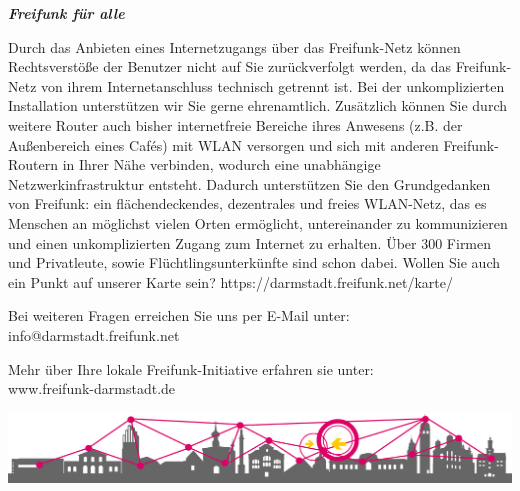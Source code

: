 \documentclass[a4paper]{article}
\begin{document}
\newpage

\thispagestyle{empty}

\begin{center}
  \Huge \textit{\textbf{\textcolor{freifunkpink}{Freifunk für alle}}} \\
  \vspace{0.6cm}
\end{center}

\begin{Row}[cellsep=0.75cm]
  \begin{Cell}{1}
      Durch das Anbieten eines Internetzugangs über das Freifunk-Netz können Rechtsverstöße der Benutzer nicht auf Sie zurückverfolgt werden, da das Freifunk-Netz von ihrem Internetanschluss technisch getrennt ist.
      Bei der unkomplizierten Installation unterstützen wir Sie gerne ehrenamtlich. Zusätzlich können Sie durch weitere Router auch bisher internetfreie Bereiche ihres Anwesens (z.B. der Außenbereich eines Cafés) mit WLAN versorgen und sich mit anderen Freifunk-Routern in Ihrer Nähe verbinden, wodurch eine unabhängige Netzwerkinfrastruktur entsteht. Dadurch unterstützen Sie den Grundgedanken von Freifunk: ein flächendeckendes, dezentrales und freies WLAN-Netz, das es Menschen an möglichst vielen Orten ermöglicht, untereinander zu kommunizieren und einen unkomplizierten Zugang zum Internet zu erhalten. Über 300 Firmen und Privatleute, sowie Flüchtlingsunterkünfte sind schon dabei.
      Wollen Sie auch ein Punkt auf unserer Karte sein? https://darmstadt.freifunk.net/karte/

      \vspace{1cm}


      \begin{center}
        Bei weiteren Fragen erreichen Sie uns per E-Mail unter:\\
        info@darmstadt.freifunk.net

        \vspace{1cm}
        Mehr über Ihre lokale Freifunk-Initiative erfahren sie unter:\\
        \vspace{0.5cm}
        \large www.freifunk-darmstadt.de
      \end{center}
      \vspace{2cm}


  \end{Cell}
\end{Row}

\vspace{0.8cm}
\begin{center}
  \hspace*{-0.05 \paperwidth}\includegraphics[width=\paperwidth]{../images/footer_skyline_notext.png}
\end{center}
\end{document}
